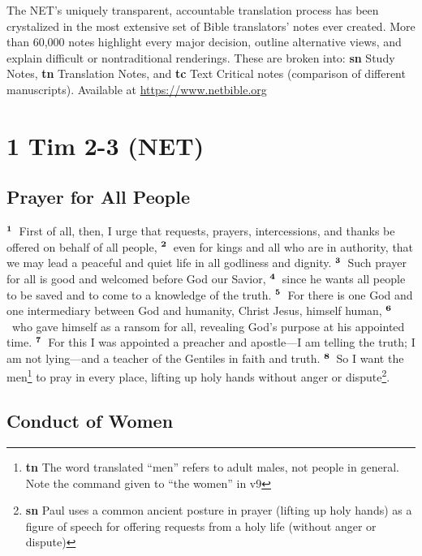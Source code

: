 \documentclass[10pt,a4paper,final, twocolumn]{article}
\renewcommand{\textsuperscript}[1]{\ensuremath{^{\textbf{\scriptsize #1}}}}
\begin{document}
The NET’s uniquely transparent, accountable translation process has been crystalized in the most extensive set of Bible translators’ notes ever created. More than 60,000 notes highlight every major decision, outline alternative views, and explain difficult or nontraditional renderings. These are broken into: \textbf{sn} Study Notes, \textbf{tn} Translation Notes, and \textbf{tc} Text Critical notes (comparison of different manuscripts). Available at \url{https://www.netbible.org}

\section*{1 Tim 2-3 (NET)}




\subsection*{Prayer for All People}

\textsuperscript{1} First of all, then, I urge that requests, prayers, intercessions, and thanks be offered on behalf of all people, \textsuperscript{2} even for kings and all who are in authority, that we may lead a peaceful and quiet life in all godliness and dignity. \textsuperscript{3} Such prayer for all is good and welcomed before God our Savior, \textsuperscript{4} since he wants all people to be saved and to come to a knowledge of the truth. \textsuperscript{5} For there is one God and one intermediary between God and humanity, Christ Jesus, himself human, \textsuperscript{6} who gave himself as a ransom for all, revealing God’s purpose at his appointed time. \textsuperscript{7} For this I was appointed a preacher and apostle—I am telling the truth; I am not lying—and a teacher of the Gentiles in faith and truth. \textsuperscript{8} So I want the men\footnote{\textbf{tn} The word translated ``men'' refers to adult males, not people in general. Note the command given to ``the women'' in v9} to pray in every place, lifting up holy hands without anger or dispute\footnote{\textbf{sn} Paul uses a common ancient posture in prayer (lifting up holy hands) as a figure of speech for offering requests from a holy life (without anger or dispute)}. 


\subsection*{Conduct of Women}
\end{document}
